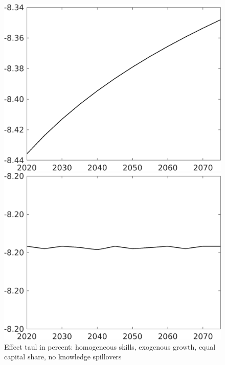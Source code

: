 \begin{figure}[h!!]
	\centering
	\caption{Effect taul in percent: homogeneous skills, exogenous growth, equal capital share, no knowledge spillovers }\label{fig:LF_BAU_nsk1_xgr1_equalcapShare_noknow}
	\begin{minipage}[]{0.32\textwidth}
		\includegraphics[width=1\textwidth]{../../codding_model/own_basedOnFried/optimalPol_010922_revision/figures/all_13Sept22/CompTaul_Equlab_LFBAUPer_Reg0_Emnet_spillover0_nsk1_xgr1_knspil1_sep1_countec0_GovRev1_etaa0.79.png}
	\end{minipage}	
	\begin{minipage}[]{0.32\textwidth}
		\includegraphics[width=1\textwidth]{../../codding_model/own_basedOnFried/optimalPol_010922_revision/figures/all_13Sept22/CompTaul_Equlab_LFBAUPer_Reg0_hh_spillover0_nsk1_xgr1_knspil1_sep1_countec0_GovRev1_etaa0.79.png}

\end{minipage}
\end{figure}
